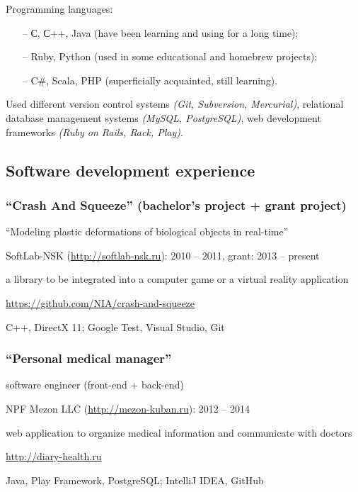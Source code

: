 \documentclass[a4paper, 12pt]{article}
\begin{document}
  Programming languages:

  \begin{itemize}[itemsep=1.5mm,topsep=2mm]
    \item[--] С, С++, Java (have been learning and using for a long time);
    \item[--] Ruby, Python (used in some educational and homebrew projects);
    \item[--] C\#, Scala, PHP (superficially acquainted, still learning).
  \end{itemize}

  Used different version control systems \emph{(Git, Subversion, Mercurial)}, relational database
  management systems \emph{(MySQL, PostgreSQL)}, web development frameworks \emph{(Ruby on Rails, Rack, Play)}.

  \subsection*{Software development experience}

  \subsubsection*{``Crash And Squeeze'' (bachelor's project + grant project)}
  \begin{description}[labelindent=1em] %
    \item[Topic:] ``Modeling plastic deformations of biological objects in real-time''
    \item[Company:] SoftLab-NSK (\url{http://softlab-nsk.ru}): 2010 -- 2011, grant: 2013 -- present
    \item[Description:] a library to be integrated into a computer game or a virtual reality application
    \item[Source code:] \url{https://github.com/NIA/crash-and-squeeze}
    \item[Technologies and tools:] C++, DirectX 11; Google Test, Visual Studio, Git
  \end{description}


  \subsubsection*{``Personal medical manager''}
  \begin{description}[labelindent=1em]
    \item[Position:] software engineer (front-end + back-end)
    \item[Company:] NPF Mezon LLC (\url{http://mezon-kuban.ru}): 2012 -- 2014
    \item[Description:] web application to organize medical information and communicate with doctors
    \item[Website:] \url{http://diary-health.ru}
    \item[Technologies and tools:] Java, Play Framework, PostgreSQL; IntelliJ IDEA, GitHub
  \end{description}
\end{document}
